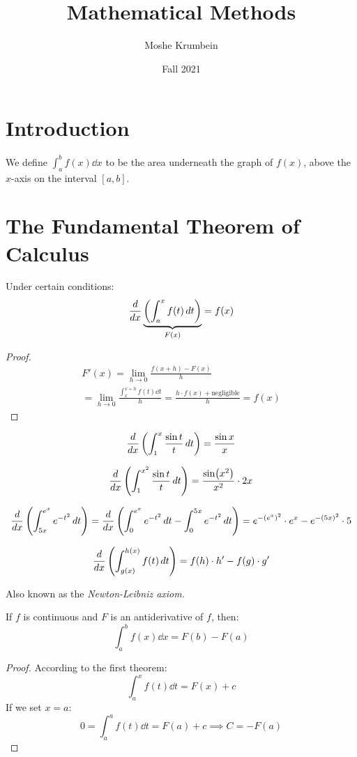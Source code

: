 \documentclass[00_complete]{subfiles}
\title{Mathematical Methods}
\author{Moshe Krumbein}
\date{Fall 2021}
\begin{document}

\section{Introduction}

We define $\int_{a}^{b}f(x)\dd{x}$ to be the area underneath the graph of
$f(x)$, above the $x$-axis on the interval $[a,b]$.

\section{The Fundamental Theorem of Calculus}
\begin{definition}
    Under certain conditions:
    $$\dv{x}\underbrace{\left(\int_{a}^{x}f(t)\dd{t}\right)}_{F(x)} = f(x)$$
    \begin{proof}
        $$
        \begin{gathered}
            F'(x)= \lim\limits_{h \to 0} \frac{f(x+h)-F(x)}{h} \\
            = \lim\limits_{h \to 0} \frac{\int_{x}^{x+h}f(t)\dd{t}}{h} =
            \frac{h\cdot f(x) + \text{negligible}}{h} = f(x)
        \end{gathered}
        $$
    \end{proof}
\end{definition}
\begin{example}
    $$
        \dv{x}\left(\int_{1}^{x}\frac{\sin t}{t}\dd{t}\right) = \frac{\sin x}{x}
    $$
\end{example}
\begin{example}
    $$
        \dv{x}\left(\int_{1}^{x^2}\frac{\sin t}{t}\dd{t}\right) = \frac{\sin
        (x^2)}{x^2}\cdot 2x
    $$
\end{example}
\begin{example}
    $$
        \dv{x}\left(\int_{5x}^{e^x} e^{-t^2}\dd{t}\right) =
        \dv{x}\left(\int_{0}^{e^x}e^{-t^2}\dd{t}-\int_{0}^{5x}e^{-t^2}\dd{t}\right)
        = e^{-(e^x)^2}\cdot e^x - e^{-(5x)^2}\cdot 5
    $$
\end{example}
\begin{definition}
    $$\dv{x}\left(\int_{g(x)}^{h(x)}f(t)\dd{t}\right)=f(h)\cdot h'-f(g)\cdot g'$$
\end{definition}
\begin{definition}
    Also known as the \emph{Newton-Leibniz axiom.}

    If $f$ is continuous and $F$ is an antiderivative of $f$, then:
    $$\int_{a}^{b}f(x)\dd{x}=F(b)-F(a)$$
    \begin{proof}
        According to the first theorem:
        $$\int_{a}^{x}f(t)\dd{t}=F(x)+c$$
        If we set $x=a$:
        $$0=\int_{a}^{a}f(t)\dd{t}=F(a)+c \implies C = -F(a)$$
    \end{proof}
\end{definition}
\end{document}
